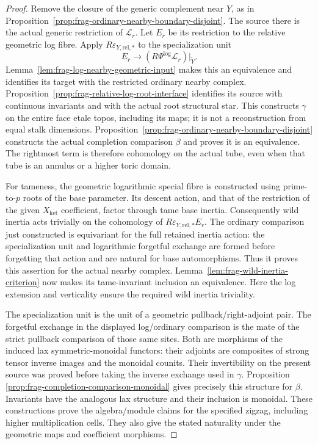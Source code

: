 \documentclass[11pt]{article}
\theoremstyle{definition}
\theoremstyle{remark}
\begin{document}
\begin{proof}
Remove the closure of the generic complement near $Y$, as in Proposition~\ref{prop:frag-ordinary-nearby-boundary-disjoint}.
The source there is the actual generic restriction of $\mathcal L_r$.
Let $E_r$ be its restriction to the relative geometric log fibre.
Apply $R\varepsilon_{Y,\mathrm{rel},*}$ to the specialization unit
\[
 E_r\longrightarrow (R\Psi^{\log}\mathcal L_r)|_{\widetilde Y}.
\]
Lemma~\ref{lem:frag-log-nearby-geometric-input} makes this an
equivalence and identifies its target with the restricted ordinary
nearby complex.  Proposition~\ref{prop:frag-relative-log-root-interface}
identifies its source with continuous invariants and with the actual
root structural star.  This constructs $\gamma$ on the entire face
etale topos, including its maps; it is not a reconstruction from equal
stalk dimensions.  Proposition~\ref{prop:frag-ordinary-nearby-boundary-disjoint}
constructs the actual completion comparison $\beta$ and proves it is
an equivalence.  The rightmost term is therefore cohomology on the
actual tube, even when that tube is an annulus or a higher toric domain.

For tameness, the geometric logarithmic special fibre is constructed
using prime-to-$p$ roots of the base parameter.  Its descent action,
and that of the restriction of the given $X_{\mathrm{ket}}$ coefficient,
factor through tame base inertia.  Consequently wild inertia acts
trivially on the cohomology of
$R\varepsilon_{Y,\mathrm{rel},*}E_r$.  The ordinary comparison just
constructed is equivariant for the full retained inertia action:
the specialization unit and logarithmic forgetful exchange are formed
before forgetting that action and are natural for base automorphisms.
Thus it proves this assertion for the
actual nearby complex.  Lemma~\ref{lem:frag-wild-inertia-criterion}
now makes its tame-invariant inclusion an equivalence.  Here the log extension and verticality ensure the required wild
inertia triviality.

The specialization unit is the unit of a geometric pullback/right-adjoint
pair.  The forgetful exchange in the displayed log/ordinary comparison
is the mate of the strict pullback comparison of those same sites.
Both are morphisms of the induced lax symmetric-monoidal functors:
their adjoints are composites of strong tensor inverse images and the
monoidal counits.  Their invertibility on the present source was proved
before taking the inverse exchange used in $\gamma$.  Proposition~
\ref{prop:frag-completion-comparison-monoidal} gives precisely this
structure for $\beta$.  Invariants have the analogous lax structure
and their inclusion is monoidal.  These constructions prove the
algebra/module claims for the specified zigzag, including higher
multiplication cells.
They also give the stated naturality under the geometric maps and
coefficient morphisms.


\end{proof}
\end{document}
